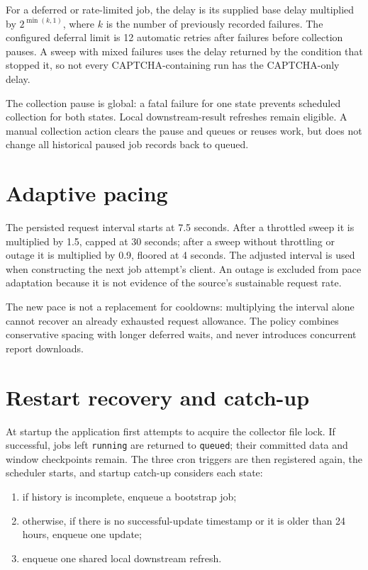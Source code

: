 \documentclass[12pt,a4paper,oneside]{report}
\numberwithin{equation}{chapter}
\numberwithin{figure}{chapter}
\numberwithin{table}{chapter}
\theoremstyle{definition}
\begin{document}
For a deferred or rate-limited job, the delay is its supplied base delay multiplied by $2^{\min(k,1)}$, where $k$ is the number of previously recorded failures. The configured deferral limit is 12 automatic retries after failures before collection pauses. A sweep with mixed failures uses the delay returned by the condition that stopped it, so not every CAPTCHA-containing run has the CAPTCHA-only delay.

The collection pause is global: a fatal failure for one state prevents scheduled collection for both states. Local downstream-result refreshes remain eligible. A manual collection action clears the pause and queues or reuses work, but does not change all historical paused job records back to queued.

\section{Adaptive pacing}
The persisted request interval starts at 7.5 seconds. After a throttled sweep it is multiplied by 1.5, capped at 30 seconds; after a sweep without throttling or outage it is multiplied by 0.9, floored at 4 seconds. The adjusted interval is used when constructing the next job attempt's client. An outage is excluded from pace adaptation because it is not evidence of the source's sustainable request rate.

The new pace is not a replacement for cooldowns: multiplying the interval alone cannot recover an already exhausted request allowance. The policy combines conservative spacing with longer deferred waits, and never introduces concurrent report downloads.

\section{Restart recovery and catch-up}
At startup the application first attempts to acquire the collector file lock. If successful, jobs left \texttt{running} are returned to \texttt{queued}; their committed data and window checkpoints remain. The three cron triggers are then registered again, the scheduler starts, and startup catch-up considers each state:
\begin{enumerate}
  \item if history is incomplete, enqueue a bootstrap job;
  \item otherwise, if there is no successful-update timestamp or it is older than 24 hours, enqueue one update;
  \item enqueue one shared local downstream refresh.
\end{enumerate}
\end{document}
